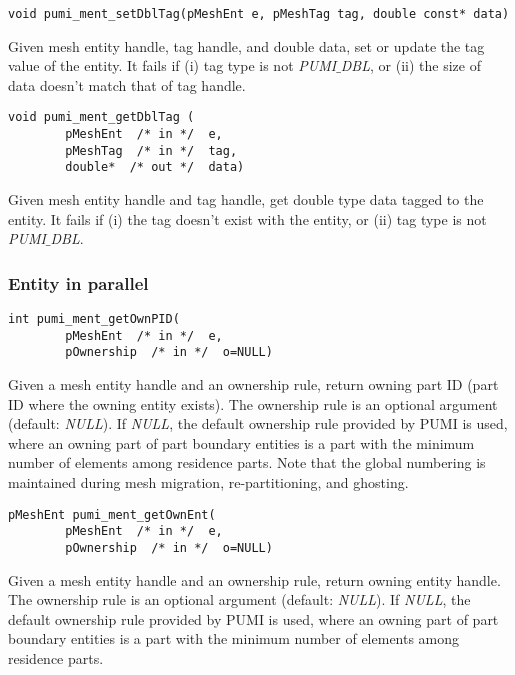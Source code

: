 \begin{verbatim}
void pumi_ment_setDblTag(pMeshEnt e, pMeshTag tag, double const* data)
\end{verbatim}\vspace{-.5cm}\hspace{1cm}
Given mesh entity handle, tag handle, and double data, set or update the tag value of the entity. It fails if (i) tag type is not \emph{PUMI}$\_$\emph{DBL}, or (ii) the size of data doesn't match that of tag handle.


\begin{verbatim}
void pumi_ment_getDblTag ( 
        pMeshEnt  /* in */  e, 
        pMeshTag  /* in */  tag, 
        double*  /* out */  data)
\end{verbatim}\vspace{-.5cm}\hspace{1cm}
Given mesh entity handle and tag handle, get double type data tagged to the entity. It fails if (i) the tag doesn't exist with the entity, or (ii) tag type is not \emph{PUMI}$\_$\emph{DBL}.


\subsubsection{Entity in parallel}

\begin{verbatim}
int pumi_ment_getOwnPID(
        pMeshEnt  /* in */  e, 
        pOwnership  /* in */  o=NULL) 
\end{verbatim}\vspace{-.5cm}\hspace{1cm}
       Given a mesh entity handle and an ownership rule, return owning part ID (part ID where the owning entity exists).
The ownership rule is an optional argument (default: \emph{NULL}). If \emph{NULL}, the default ownership rule provided by PUMI is used, where an owning part of part boundary entities is a part with the minimum number of elements among residence parts. Note that the global numbering is maintained during mesh migration, re-partitioning, and ghosting.

\begin{verbatim}
pMeshEnt pumi_ment_getOwnEnt(
        pMeshEnt  /* in */  e, 
        pOwnership  /* in */  o=NULL) 
\end{verbatim}\vspace{-.5cm}\hspace{1cm}       
        Given a mesh entity handle and an ownership rule, return owning entity handle. The ownership rule is an optional argument (default: \emph{NULL}). If \emph{NULL}, the default ownership rule provided by PUMI is used, where an owning part of part boundary entities is a part with the minimum number of elements among residence parts.

